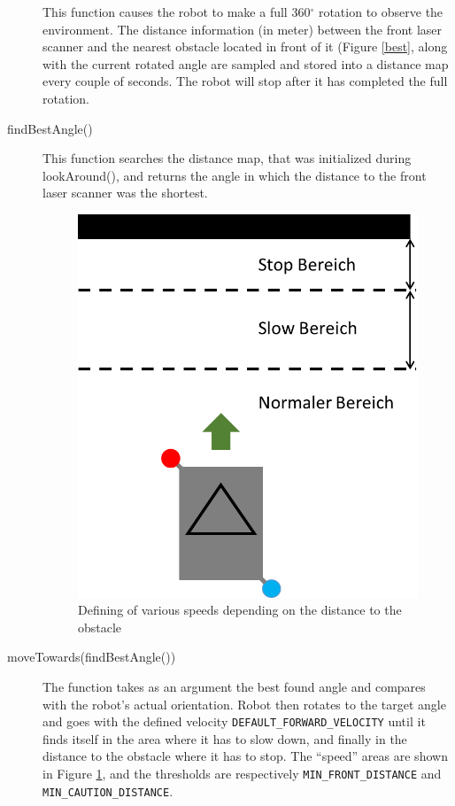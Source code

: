 \begin{description}
This function causes the robot to make a full 360$^{\circ}$ rotation to observe the environment. The distance information (in meter) between the front laser scanner and the nearest obstacle located in front of it (Figure \ref{best}, along with the current rotated angle are sampled and stored into a distance map every couple of seconds. The robot will stop after it has completed the full rotation.

\item[findBestAngle()] This function searches the distance map, that was initialized during lookAround(), and returns the angle in which the distance to the front laser scanner was the shortest. 

\begin{figure}[ht]
\centering
\includegraphics[scale=0.6]{graphics/Zone.png}
\caption{Defining of various speeds depending on the distance to the obstacle}
\label{Zone}
\centering
\end{figure}

\item[moveTowards(findBestAngle())] The function takes as an argument the best found angle and compares with the robot's actual orientation. Robot then rotates to the target angle and goes with the defined velocity \texttt{DEFAULT\_FORWARD\_VELOCITY}
 until it finds itself in the area where it has to slow down, and finally in the distance to the obstacle where it has to stop. The ``speed'' areas are shown in Figure \ref{Zone}, and the thresholds are respectively \texttt{MIN\_FRONT\_DISTANCE} and \texttt{MIN\_CAUTION\_DISTANCE}. 
 

\end{description}
